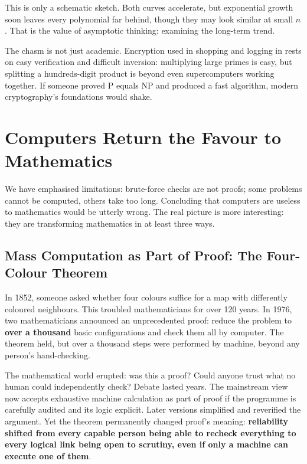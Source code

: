 \begin{zhu}
This is only a schematic sketch. Both curves accelerate, but exponential growth soon leaves every polynomial far behind, though they may look similar at small $n$. That is the value of asymptotic thinking: examining the long-term trend.
\end{zhu}

The chasm is not just academic. Encryption used in shopping and logging in rests on easy verification and difficult inversion: multiplying large primes is easy, but splitting a hundreds-digit product is beyond even supercomputers working together. If someone proved P equals NP and produced a fast algorithm, modern cryptography's foundations would shake.

\section{Computers Return the Favour to Mathematics}

We have emphasised limitations: brute-force checks are not proofs; some problems cannot be computed, others take too long. Concluding that computers are useless to mathematics would be utterly wrong. The real picture is more interesting: they are transforming mathematics in at least three ways.

\subsection{Mass Computation as Part of Proof: The Four-Colour Theorem}

In 1852, someone asked whether four colours suffice for a map with differently coloured neighbours. This troubled mathematicians for over 120 years. In 1976, two mathematicians announced an unprecedented proof: reduce the problem to \textbf{over a thousand} basic configurations and check them all by computer. The theorem held, but over a thousand steps were performed by machine, beyond any person's hand-checking.

The mathematical world erupted: was this a proof? Could anyone trust what no human could independently check? Debate lasted years. The mainstream view now accepts exhaustive machine calculation as part of proof if the programme is carefully audited and its logic explicit. Later versions simplified and reverified the argument. Yet the theorem permanently changed proof's meaning: \textbf{reliability shifted from every capable person being able to recheck everything to every logical link being open to scrutiny, even if only a machine can execute one of them}.

